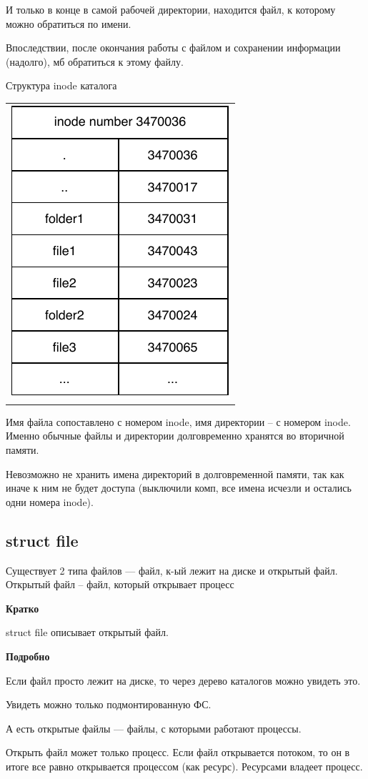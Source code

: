 И только в конце в самой рабочей директории, находится файл, к которому можно обратиться по имени.

Впоследствии, после окончания работы с файлом и сохранении информации (надолго), мб обратиться к этому файлу.

Структура inode каталога
\begin{table}[H]
  \centering
  \begin{tabular}{p{1\linewidth}}
    \centering
    \includegraphics[width=0.3\linewidth]{./images/inode_catalog.pdf}
  \end{tabular}
\end{table}

Имя файла сопоставлено с номером inode, имя директории -- с номером inode. Именно обычные файлы и директории долговременно хранятся во вторичной памяти.

Невозможно не хранить имена директорий в долговременной памяти, так как иначе к ним не будет доступа (выключили комп, все имена исчезли и остались одни номера inode).

\subsection{struct file}

Существует 2 типа файлов --- файл, к-ый лежит на диске и открытый файл. Открытый файл -- файл, который открывает процесс

\textbf{Кратко}

struct file описывает открытый файл.

\textbf{Подробно}

Если файл просто лежит на диске, то через дерево каталогов можно увидеть это. 

Увидеть можно только подмонтированную ФС.

А есть открытые файлы --- файлы, с которыми работают процессы.

Открыть файл может только процесс. Если файл открывается потоком, то он в итоге все равно открывается процессом (как ресурс). Ресурсами владеет процесс.


